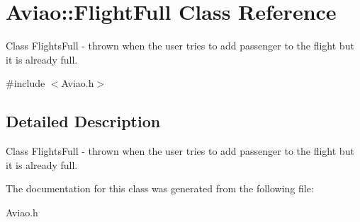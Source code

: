 \hypertarget{class_aviao_1_1_flight_full}{}\section{Aviao\+:\+:Flight\+Full Class Reference}
\label{class_aviao_1_1_flight_full}


Class Flights\+Full -\/ thrown when the user tries to add passenger to the flight but it is already full.  




{\ttfamily \#include $<$Aviao.\+h$>$}



\subsection{Detailed Description}
Class Flights\+Full -\/ thrown when the user tries to add passenger to the flight but it is already full. 

The documentation for this class was generated from the following file\+:\begin{DoxyCompactItemize}
\item 
Aviao.\+h\end{DoxyCompactItemize}
